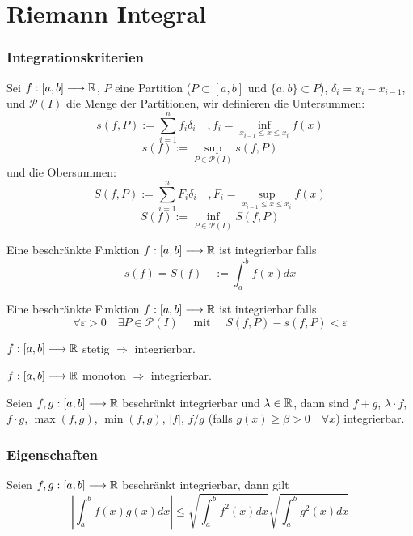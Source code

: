 \part{Riemann Integral}
\setcounter{section}{0}


\section{Integrationskriterien}

\Def Sei $f : [a,b] \longrightarrow \mathbb{R}$, $P$ eine Partition ($P \subset [a,b]$ und $\{a,b\} \subset P$), $\delta_{i} = x_i-x_{i-1}$,
und $\mathcal{P}(I)$ die Menge der Partitionen, wir definieren die Untersummen:
$$s(f, P):=\sum_{i=1}^{n} f_{i} \delta_{i} \quad, f_i = \inf_{x_{i-1}\leq x \leq x_i} f(x)$$
$$s(f):=\sup_{P \in \mathcal{P}(I)} s(f, P)$$
und die Obersummen:
$$S(f, P):=\sum_{i=1}^{n} F_{i} \delta_{i} \quad, F_i = \sup_{x_{i-1}\leq x \leq x_i} f(x)$$
$$S(f):=\inf_{P \in \mathcal{P}(I)} S(f, P)$$

\Def Eine beschränkte Funktion $f : [a,b] \longrightarrow \mathbb{R}$ ist integrierbar falls
$$s(f) = S(f) \quad := \int_{a}^{b} f(x) dx$$

\Satz Eine beschränkte Funktion $f : [a,b] \longrightarrow \mathbb{R}$ ist integrierbar falls
$$\forall \varepsilon>0 \quad \exists P \in \mathcal{P}(I) \quad \text { mit } \quad S(f, P)-s(f, P)<\varepsilon$$

\Satz $f : [a,b] \longrightarrow \mathbb{R}$  stetig $\Rightarrow$ integrierbar.

\Satz $f : [a,b] \longrightarrow \mathbb{R}$  monoton $\Rightarrow$ integrierbar.

\Satz Seien $f,g : [a,b] \longrightarrow \mathbb{R}$ beschränkt integrierbar und $\lambda \in \mathbb{R}$, dann sind $f+g$, $\lambda \cdot f$, $f \cdot g$, 
$\max (f,g)$, $\min (f,g)$, $|f|$,  $f / g$ (falls $g(x) \geq \beta > 0 \quad \forall x$) integrierbar.


\section{Eigenschaften}

 Seien $f,g : [a,b] \longrightarrow \mathbb{R}$ beschränkt integrierbar, dann gilt
$$
\left|\int_{a}^{b} f(x) g(x) d x\right| \leqslant \sqrt{\int_{a}^{b} f^{2}(x) d x} \sqrt{\int_{a}^{b} g^{2}(x) d x}
$$


